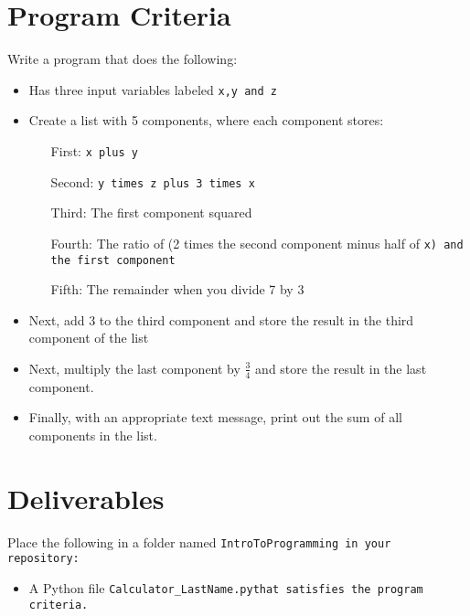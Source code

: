 \documentclass{article}
\newcommand\foldername{\tt{IntroToProgramming} }
\newcommand\filename{\tt{Calculator\_LastName.py}\;\;}
\begin{document}
\section*{Program Criteria}
	Write a program that does the following:
	\begin{itemize}
		\item Has three input variables labeled \tt{x,y} and \tt{z}
		\item Create a list with 5 components, where each component stores:
		\begin{enumerate}
			\item[First:] \tt{x} plus \tt{y}
			\item[Second:] \tt{y} times \tt{z} plus 3 times \tt{x}
			\item[Third:] The first component squared
			\item[Fourth:] The ratio of (2 times the second component minus half of \tt{x}) and the first component
			\item[Fifth:] The remainder when you divide 7 by 3
		\end{enumerate}
		\item Next, add 3 to the third component and store the result in the third component of the list
		\item Next, multiply the last component by $\frac{3}{4}$ and store the result in the last component.
		\item Finally, with an appropriate text message, print out the sum of all components in the list.
	\end{itemize}







\section*{Deliverables}
	Place the following in a folder named \foldername in your repository:
	\begin{itemize}
		\item A Python file \filename  that satisfies the program criteria.
	\end{itemize}

	
\end{document}
